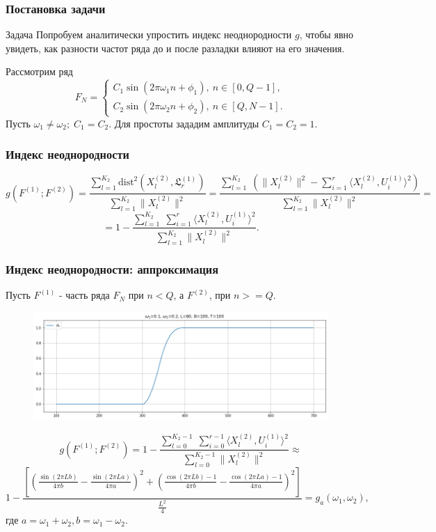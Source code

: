 \documentclass[11pt]{beamer}
\begin{document}
	\begin{frame}
		\frametitle{Постановка задачи}
		\begin{block}{Задача}
			Попробуем аналитически упростить индекс неоднородности $ g $, чтобы явно увидеть, как разности частот ряда до и после разладки влияют на его значения.
		\end{block}
		Рассмотрим ряд
		\begin{equation*} 
			F_N = 
			\begin{cases} 
				C_1\sin(2\pi\omega_1 n + \phi_1),\ n \in [0, Q-1], \\ 
				C_2\sin(2\pi\omega_2 n + \phi_2),\ n \in [Q, N-1]. 
			\end{cases} 
		\end{equation*} 
		Пусть $ \omega_1 \neq \omega_2;\; C_1 = C_2 $. Для простоты зададим амплитуды $ C_1 = C_2 = 1 $.
	\end{frame}
	
	
	\begin{frame}
		\frametitle{Индекс неоднородности}
		$$ g(F^{(1)}; F^{(2)}) = \frac{\sum\limits_{l=1}^{K_2}\mathrm{dist}^2(X_l^{(2)}, \mathfrak{L}_r^{(1)})}{\sum\limits_{l=1}^{K_2}\|X_l^{(2)}\|^2} = \frac{\sum\limits_{l=1}^{K_2}\;(\|X_l^{(2)}\|^2 - \sum\limits_{i=1}^{r}\langle X_l^{(2)}, U_i^{(1)}\rangle^2)}{\sum\limits_{l=1}^{K_2}\|X_l^{(2)}\|^2} = $$
		$$ = 1 - \frac{\sum\limits_{l=1}^{K_2}\;\sum\limits_{i=1}^{r}\langle X_l^{(2)}, U_i^{(1)}\rangle^2}{\sum\limits_{l=1}^{K_2}\|X_l^{(2)}\|^2}. $$
	\end{frame}
	
	\begin{frame}
		\frametitle{Индекс неоднородности: аппроксимация}
		Пусть $ F^{(1)} $ - часть ряда $ F_N $ при $ n < Q $, а $ F^{(2)} $, при $ n >= Q $.
				
		\begin{figure}[b]
			\centering
			\includegraphics[width=0.75\linewidth]{imgs/heterogeneity_index_row.png}
		\end{figure}
		\small
		$$ g(F^{(1)}; F^{(2)}) = 1 - \frac{\sum\limits_{l=0}^{K_2-1}\;\sum\limits_{i=0}^{r-1}\langle X_l^{(2)}, U_i^{(1)}\rangle^2}{\sum\limits_{l=0}^{K_2-1}\|X_l^{(2)}\|^2} \approx $$
		$$ 1 - \frac{\left[ \left(  \frac{\sin(2\pi Lb)}{4\pi b} - \frac{\sin(2\pi La)}{4\pi a}   \right)^2 + \left(  \frac{\cos(2\pi Lb) - 1}{4\pi b} - \frac{\cos(2\pi La) - 1}{4\pi a}  \right)^2 \right]}{\frac{L^2}{4}} = g_a(\omega_1, \omega_2),$$
		где $ a = \omega_1 + \omega_2, b = \omega_1 - \omega_2 $.
	\end{frame}
	
\end{document}
